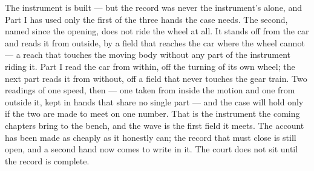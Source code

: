 The instrument is built --- but the record was never the instrument's alone, and Part I has used only the first
of the three hands the case needs. The second, named since the opening, does not ride the wheel at all. It
stands off from the car and reads it from outside, by a field that reaches the car where the wheel cannot ---
a reach that touches the moving body without any part of the instrument riding it. Part I read the car from
within, off the turning of its own wheel; the next part reads it from without, off a field that never touches
the gear train. Two readings of one speed,
then --- one taken from inside the motion and one from outside it, kept in hands that share no single part ---
and the case will hold only if the two are made to meet on one number. That is the instrument the coming
chapters bring to the bench, and the wave is the first field it meets. The account has been made as
cheaply as it honestly can; the record that must close is still open, and a second hand now comes to write in
it. The court does not sit until the record is complete.
